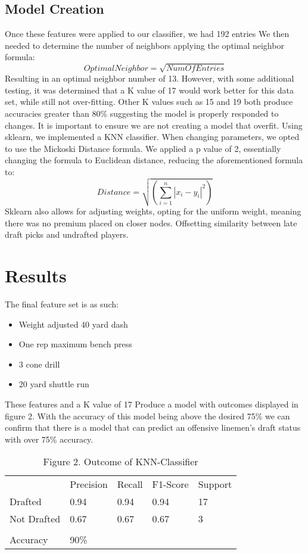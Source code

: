\documentclass[confrence]{IEEEtran}
\begin{document}
\subsection*{Model Creation}
Once these features were applied to our classifier, we had 192 entries
We then needed to determine the number of neighbors applying the optimal neighbor formula: \[OptimalNeighbor = \sqrt{NumOfEntries}\]
Resulting in an optimal neighbor number of 13.
However, with some additional testing, it was determined that a K value of 17 would work better for this data set, while still not over-fitting.
Other K values such as 15 and 19 both produce accuracies greater than 80\% suggesting the model is properly responded to changes.
It is important to ensure we are not creating a model that overfit.
Using sklearn, we implemented a KNN classifier. When changing parameters, we opted to use the Mickoski Distance formula.
We applied a p value of 2, essentially changing the formula to Euclidean distance, reducing the aforementioned formula to:
\[Distance = \sqrt{(\sum_{i=1}^n|x_i-y_i|^2)}\]
Sklearn also allows for adjusting weights, opting for the uniform weight, meaning there was no premium placed on closer nodes.
Offsetting similarity between late draft picks and undrafted players.
\section*{Results}
The final feature set is as such:
\begin{itemize}
    \item Weight adjusted 40 yard dash
    \item One rep maximum bench press
    \item 3 cone drill
    \item 20 yard shuttle run
\end{itemize}
These features and a K value of 17 Produce a model with outcomes displayed in figure 2.
With the accuracy of this model being above the desired 75\% we can confirm that there is a model that can predict an offensive linemen's draft status with over 75\% accuracy.
\begin{table}[htbp]
\begin{tabular}{lllll}
            & Precision & Recall & F1-Score & Support \\
Drafted     & 0.94      & 0.94   & 0.94     & 17      \\
Not Drafted & 0.67      & 0.67   & 0.67     & 3       \\
            &           &        &          &         \\
Accuracy    & 90\%      &        &          &         \\
\end{tabular}
\caption{Figure 2. Outcome of KNN-Classifier}
\end{table}
\end{document}
